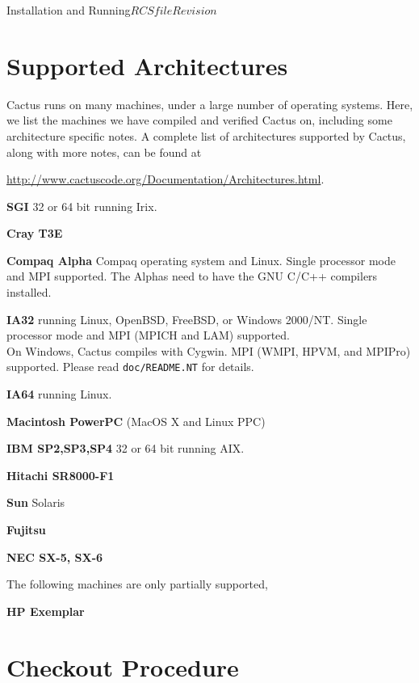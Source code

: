 \begin{cactuspart}{Installation and Running}{$RCSfile$}{$Revision$}
\section{Supported Architectures}
\label{sec:suar}

Cactus runs on many machines, under a large number of operating
systems.  Here, we list the machines we have compiled and verified
Cactus on, including some architecture specific notes.  A complete
list of architectures supported by Cactus, along with more notes, can
be found at
\begin{center}
\url{http://www.cactuscode.org/Documentation/Architectures.html}.
\end{center}

\begin{Lentry}
\item[\textbf{SGI}] 32 or 64 bit running Irix.
\item[\textbf{Cray T3E}]
\item[\textbf{Compaq Alpha}]  Compaq operating system and Linux.
  Single processor
  mode and MPI supported. The Alphas need to have the GNU C/C++
  compilers installed.
\item[\textbf{IA32}] running Linux, OpenBSD, FreeBSD, or Windows 2000/NT.
  Single processor mode and MPI (MPICH and LAM) supported.\\
  On Windows, Cactus compiles with Cygwin.  MPI (WMPI, HPVM, and MPIPro)
  supported.  Please read \texttt{doc/README.NT} for details.
\item[\textbf{IA64}]  running Linux.
\item[\textbf{Macintosh PowerPC}] (MacOS X and Linux PPC)
\item[\textbf{IBM SP2,SP3,SP4}] 32 or 64 bit running AIX.
\item[\textbf{Hitachi SR8000-F1}]
\item[\textbf{Sun} Solaris]
\item[\textbf{Fujitsu}]
\item[\textbf{NEC SX-5, SX-6}]
\end{Lentry}

The following machines are only partially supported,
\begin{Lentry}
\item[\textbf{HP Exemplar}]
\end{Lentry}


\section{Checkout Procedure}
\label{sec:checkout}


\end{cactuspart}
